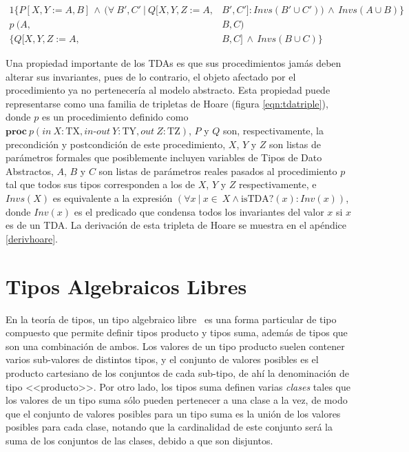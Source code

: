 \begin{alignat}{1}
  \{ P[X,Y:=A,B]\, \land \, (\forall\ B', C'\ |\ Q[X,Y,Z:=A,&B',C'] : Invs(B' \cup C'))\, \land \, Invs(A \cup B)   \} \nonumber \\
  p\  (A,&B,C) \label{eqn:tdatriple2} \\ 
  \{ Q[X,Y,Z:=A,&B,C]\, \land \, Invs(B \cup C)\} \nonumber
\end{alignat}

Una propiedad importante de los TDAs es que sus procedimientos jamás deben
alterar sus invariantes, pues de lo contrario, el objeto afectado por el
procedimiento ya no pertenecería al modelo abstracto. Esta propiedad puede
representarse como una familia de tripletas de Hoare (figura
\ref{eqn:tdatriple}), donde $p$ es un procedimiento definido como
$\textbf{proc}\ p (in\ X : \textrm{TX}, in\textrm{-}out\ Y : \textrm{TY}, out\ Z : \textrm{TZ})$, $P$ y $Q$ son, respectivamente, la precondición y postcondición de este procedimiento, $X$, $Y$ y $Z$ son listas de parámetros formales que posiblemente incluyen
variables de Tipos de Dato Abstractos, $A$, $B$ y $C$ son listas de parámetros reales pasados al procedimiento $p$ tal que todos sus tipos corresponden a los de $X$, $Y$ y $Z$ respectivamente, e $Invs(X)$ es equivalente a la expresión $(\forall x\ |\ x \in\ X \land \textrm{isTDA?}(x) : Inv(x) )$, donde $Inv(x)$ es el predicado que condensa todos los
invariantes del valor $x$ si $x$ es de un TDA. La derivación de esta tripleta de Hoare se muestra en el apéndice \ref{derivhoare}.

\section{Tipos Algebraicos Libres}

En la teoría de tipos, un tipo algebraico libre~\cite{ravelotal, foldoc,
lazywithclass} es una forma particular de tipo compuesto que permite definir
tipos producto y tipos suma, además de tipos que son una combinación de ambos.
Los valores de un tipo producto suelen contener varios sub-valores de distintos
tipos, y el conjunto de valores posibles es el producto cartesiano de los
conjuntos de cada sub-tipo, de ahí la denominación de tipo <<producto>>. Por
otro lado, los tipos suma definen varias \textit{clases} tales que  los valores
de un tipo suma sólo pueden pertenecer a una clase a la vez, de modo que el
conjunto de valores posibles para un tipo suma es la unión de los valores
posibles para cada clase, notando que la cardinalidad de este conjunto será la
suma de los conjuntos de las clases, debido a que son disjuntos.

